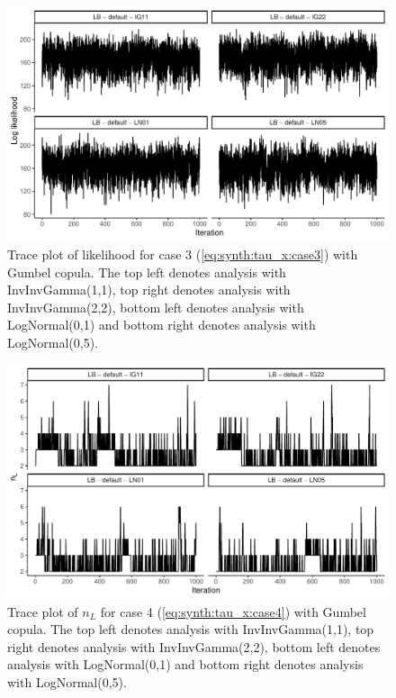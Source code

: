 \documentclass{amsart}
\begin{document}
\begin{figure}
	\centering
	\includegraphics[width = 0.75\linewidth]{trace_case3_gumbel_like.pdf}
	\caption{Trace plot of likelihood for case 3 (\cref{eq:synth:tau_x:case3}) with Gumbel copula. The top left denotes analysis with InvInvGamma(1,1), top right denotes analysis with InvInvGamma(2,2), bottom left denotes analysis with LogNormal(0,1) and bottom right denotes analysis with LogNormal(0,5).}
	\label{fig:case3:gumbel:like}
\end{figure}

\begin{figure}
	\centering
	\includegraphics[width = 0.75\linewidth]{trace_case4_gumbel_nterm.pdf}
	\caption{Trace plot of $n_L$ for case 4 (\cref{eq:synth:tau_x:case4}) with Gumbel copula. The top left denotes analysis with InvInvGamma(1,1), top right denotes analysis with InvInvGamma(2,2), bottom left denotes analysis with LogNormal(0,1) and bottom right denotes analysis with LogNormal(0,5).}
	\label{fig:case4:gumbel:nterm}
\end{figure}
\end{document}
